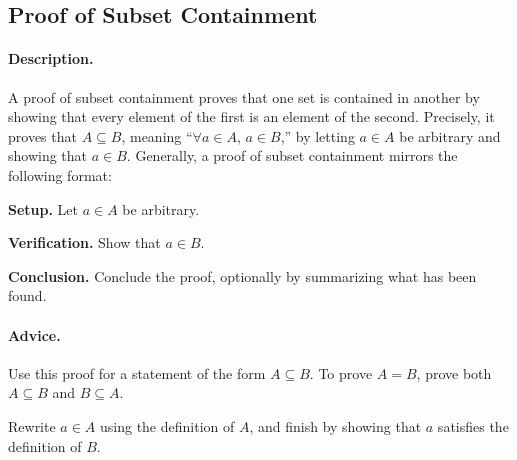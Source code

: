 \subsection{Proof of Subset Containment}
\label{subsections:techniques:universal:subset}



\paragraph{Description.}
A proof of subset containment proves that one set is contained in another %
by showing that every element of the first is an element of the second. %
Precisely, it proves that $A \subseteq B$, %
meaning ``$\forall a \in A$, $a \in B$,'' %
by letting $a \in A$ be arbitrary and showing that $a \in B$. %
Generally, a proof of subset containment mirrors the following format:
\begin{enumerate}{
    \item \textbf{Setup.} %
        Let $a \in A$ be arbitrary.
    \item \textbf{Verification.} %
        Show that $a \in B$.
    \item \textbf{Conclusion.} %
        Conclude the proof, optionally by summarizing what has been found.
}
\end{enumerate}



\paragraph{Advice.}
\begin{itemize}{
    \item Use this proof for a statement of the form $A \subseteq B$. %
        To prove $A = B$, prove both $A \subseteq B$ and $B \subseteq A$.
    \item Rewrite $a \in A$ using the definition of $A$, and finish by %
        showing that $a$ satisfies the definition of $B$.
}
\end{itemize}



